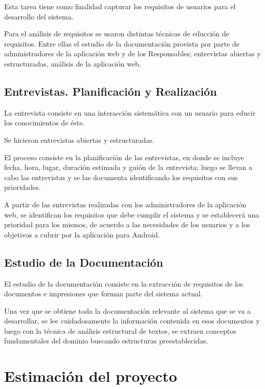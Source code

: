   Esta tarea tiene como finalidad capturar los requisitos de usuarios para el desarrollo del sistema.

Para el análisis de requisitos se usaron distintas técnicas de educción de requisitos. Entre ellas el estudio de la documentación provista por parte de administradores de la aplicación web y de los Responsables; entrevistas abiertas y estructuradas, análisis de la aplicación web.
  
  \subsection{Entrevistas. Planificación y Realización}
  
  La entrevista consiste en una interacción sistemática con un usuario para educir los conocimientos de éste.

Se hicieron entrevistas abiertas y estructuradas. 

El proceso consiste en la  planificación de las entrevistas, en donde se incluye fecha, hora, lugar, duración estimada y guión de la entrevista; luego se llevan a cabo las entrevistas y se las documenta identificando los requisitos con sus prioridades.  

A partir de las entrevistas realizadas con los administradores de la aplicación web, se identifican los requisitos que debe cumplir el sistema y se establecerá una prioridad para los mismos, de acuerdo a las necesidades de los usuarios y a los objetivos a cubrir por la aplicación para Android.

  \subsection{Estudio de la Documentación}
  
El estudio de la documentación consiste en la extracción de requisitos de los documentos e impresiones que forman parte del sistema actual.

Una vez que se obtiene toda la documentación relevante al sistema que se va a desarrollar, se lee cuidadosamente la información contenida en esos documentos y luego con la técnica de análisis estructural de textos, se extraen conceptos fundamentales del dominio buscando estructuras preestablecidas.

\section{Estimación del proyecto}

